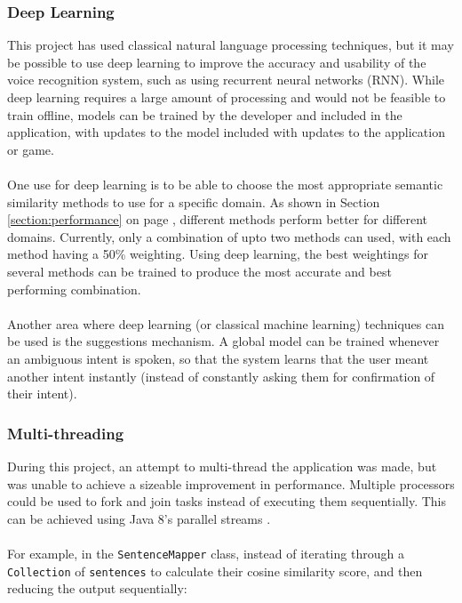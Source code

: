 \documentclass[11pt]{article}
\begin{document}
\subsubsection{Deep Learning}

This project has used classical natural language processing techniques, but it may be possible to use deep learning to improve the accuracy and usability of the voice recognition system, such as using recurrent neural networks (RNN). While deep learning requires a large amount of processing and would not be feasible to train offline, models can be trained by the developer and included in the application, with updates to the model included with updates to the application or game.
\\
\\
One use for deep learning is to be able to choose the most appropriate semantic similarity methods to use for a specific domain. As shown in Section \ref{section:performance} on page \pageref{section:eval-similarity}, different methods perform better for different domains. Currently, only a combination of upto two methods can used, with each method having a 50\% weighting. Using deep learning, the best weightings for several methods can be trained to produce the most accurate and best performing combination.
\\
\\
Another area where deep learning (or classical machine learning) techniques can be used is the suggestions mechanism. A global model can be trained whenever an ambiguous intent is spoken, so that the system learns that the user meant another intent instantly (instead of constantly asking them for confirmation of their intent).


\subsubsection{Multi-threading}

During this project, an attempt to multi-thread the application was made, but was unable to achieve a sizeable improvement in performance. Multiple processors could be used to fork and join tasks instead of executing them sequentially. This can be achieved using Java 8's parallel streams \cite{RefWorks:132}.
\\
\\
For example, in the \texttt{SentenceMapper} class, instead of iterating through a \texttt{Collection} of \texttt{sentences} to calculate their cosine similarity score, and then reducing the output sequentially:
\end{document}
